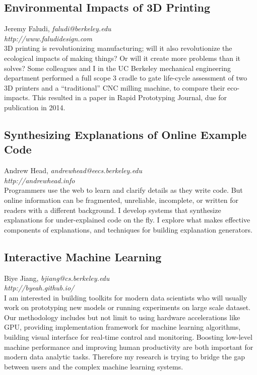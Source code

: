 \documentclass[foldmark,10pt,a4paper,notumble]{leaflet}
\newcommand{\name}[1]{#1,}
\newcommand{\email}[1]{\emph{#1}}
\newcommand{\website}[1]{\\\emph{#1}\\[3pt]}
\begin{document}
\subsection{Environmental Impacts of 3D Printing}
\name{Jeremy Faludi}
\email{faludi@berkeley.edu}
\website{http://www.faludidesign.com}
3D printing is revolutionizing manufacturing; will it also revolutionize the ecological impacts of making things? Or will it create more problems than it solves? Some colleagues and I in the UC Berkeley mechanical engineering department performed a full scope 3 cradle to gate life-cycle assessment of two 3D printers and a “traditional” CNC milling machine, to compare their eco-impacts. This resulted in a paper in Rapid Prototyping Journal, due for publication in 2014.


\subsection{Synthesizing Explanations of Online Example Code}
\name{Andrew Head}
\email{andrewhead@eecs.berkeley.edu}
\website{http://andrewhead.info}
Programmers use the web to learn and clarify details as they write code. But online information can be fragmented, unreliable, incomplete, or written for readers with a different background. I develop systems that synthesize explanations for under-explained code on the fly.  I explore what makes effective components of explanations, and techniques for building explanation generators.

\subsection{Interactive Machine Learning}
\name{Biye Jiang}
\email{bjiang@cs.berkeley.edu}
\website{http://byeah.github.io/}
I am interested in building toolkits for modern data scientists who will usually work on prototyping new models or running experiments on large scale dataset. Our methodology includes but not limit to using hardware accelerations like GPU, providing implementation framework for machine learning algorithms, building visual interface for real-time control and monitoring. Boosting low-level machine performance and improving human productivity are both important for modern data analytic tasks. Therefore my research is trying to bridge the gap between users and the complex machine learning systems.
\end{document}
